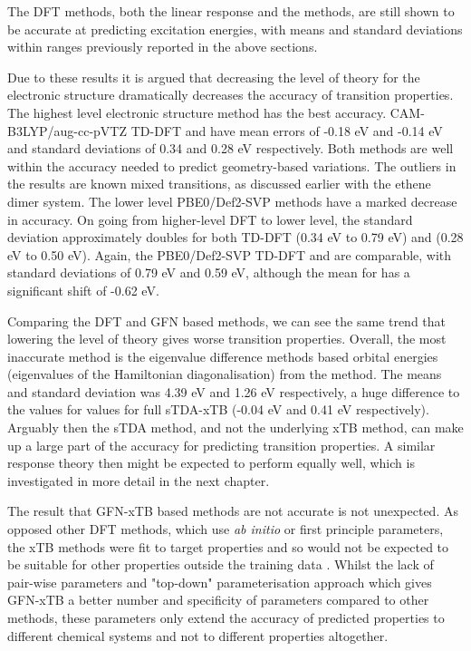 The DFT methods, both the linear response and the \dscf methods, are still shown
to be accurate at predicting excitation energies, with means and standard deviations
within ranges previously reported in the above sections.

Due to these results it is argued that decreasing the level of theory for the electronic
structure dramatically decreases the accuracy of transition properties.
The highest level electronic structure method has the best accuracy. CAM-B3LYP/aug-cc-pVTZ 
TD-DFT and \dscf have mean errors of -0.18 eV and -0.14 eV and standard
deviations of 0.34 and 0.28 eV respectively. Both methods are well within the accuracy
needed to predict geometry-based variations. The outliers in the \dscf results are known 
mixed transitions, as discussed earlier with the ethene dimer system. 
The lower level PBE0/Def2-SVP methods have a marked decrease in accuracy. On going
from higher-level DFT to lower level, the standard deviation approximately doubles 
for both TD-DFT (0.34 eV to 0.79 eV) and \dscf (0.28 eV to 0.50 eV). Again, the
PBE0/Def2-SVP TD-DFT and \dscf are comparable, with standard deviations of 0.79 eV
and 0.59 eV, although the mean for \dscf has a significant shift of -0.62 eV. 

Comparing the DFT and GFN based methods, we can see the same trend that lowering
the level of theory gives worse transition properties.
Overall, the most inaccurate method is the eigenvalue difference methods based
orbital energies (eigenvalues of the Hamiltonian diagonalisation) from the 
method. The means and standard deviation was 4.39 eV and 1.26 eV respectively,
a huge difference to the values for values for full sTDA-xTB (-0.04 eV and 0.41 eV respectively)\cite{Grimme2016}. 
Arguably then the sTDA method, and not the underlying xTB method, can make up a 
large part of the accuracy for predicting transition properties. A similar response 
theory then might be expected to perform equally well, which is investigated in 
more detail in the next chapter.

The result that GFN-xTB based methods are not accurate is not unexpected. As opposed
other DFT methods, which use \emph{ab initio} or first principle parameters, the
xTB methods were fit to target properties and so would not be expected to be suitable
for other properties outside the training data \cite{Bannwarth2020}. Whilst the 
lack of pair-wise parameters and "top-down" parameterisation approach which gives
GFN-xTB a better number and specificity of parameters compared to other methods, 
these parameters only extend the accuracy of predicted properties to different
chemical systems and not to different properties altogether.

